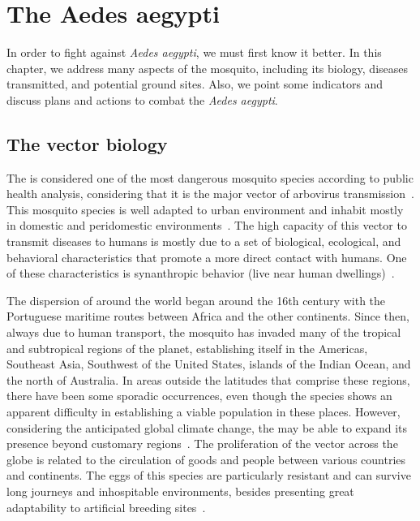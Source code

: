 \chapter{The \textbf{Aedes aegypti}}
\label{chap:mosquito}
%
In order to fight against \textit{Aedes aegypti}, we must first know it better.
In this chapter, we address many aspects of the mosquito, including its
biology, diseases transmitted, and potential ground sites.
Also, we point some indicators and discuss plans and actions to combat the \textit{Aedes aegypti}.


\section{The vector biology}\label{sec:bio}
%
The \Aedes is considered one of the most dangerous mosquito species according to public health analysis, considering that it is the major vector of arbovirus transmission~\cite{ruckert2017}.
This mosquito species is well adapted to urban environment and inhabit mostly in domestic and peridomestic environments~\cite{Jansen2010}.
The high capacity of this vector to transmit diseases to humans is mostly due to a set of biological, ecological, and behavioral characteristics that promote a more direct contact with humans.
One of these characteristics is synanthropic behavior (live near human dwellings)~\cite{Jansen2010}.

The dispersion of \Aedes around the world began around the 16th century with the Portuguese maritime routes between Africa and the other continents.
Since then, always due to human transport, the mosquito has invaded many of the tropical and subtropical regions of the planet, establishing itself in the Americas, Southeast Asia, Southwest of the United States, islands of the Indian Ocean, and the north of Australia.
In areas outside the latitudes that comprise these regions, there have been some sporadic occurrences, even though the species shows an apparent difficulty in establishing a viable population in these places. However, considering the anticipated global climate change, the \Aedes may be able to expand its presence beyond customary regions~\cite{liu2016climate}.
The proliferation of the vector across the globe is related to the circulation of goods and people between various countries and continents.
The eggs of this species are particularly resistant and can survive long journeys and inhospitable environments, besides presenting great adaptability to artificial breeding sites~\cite{liu2016climate}.

